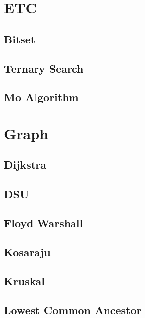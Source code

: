 \section{ETC}
\subsection{Bitset}
\raggedbottom
\hrulefill
\subsection{Ternary Search}
\raggedbottom
\hrulefill
\subsection{Mo Algorithm}
\raggedbottom
\hrulefill

\section{Graph}
\subsection{Dijkstra}
\raggedbottom
\hrulefill
\subsection{DSU}
\raggedbottom
\hrulefill
\subsection{Floyd Warshall}
\raggedbottom
\hrulefill
\subsection{Kosaraju}
\raggedbottom
\hrulefill
\subsection{Kruskal}
\raggedbottom
\hrulefill
\subsection{Lowest Common Ancestor}
\raggedbottom
\hrulefill
